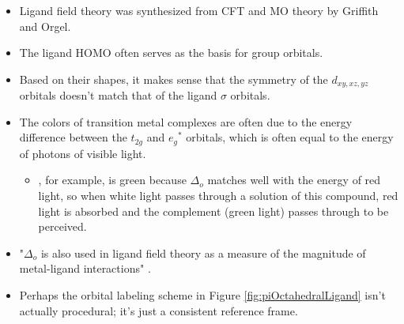 \documentclass[../notes.tex]{subfiles}
\begin{document}
\begin{itemize}
\begin{itemize}
\begin{figure}[h!]
            \caption{Crystal field splitting from the free ion.}
            \label{fig:CFT-freeIon}
        \end{figure}
        \item "The average energy of the five $d$ orbitals [in a coordination complex] is above that of the free ion orbitals [i.e., those in the metal ion before it is surrounded by ligands], because the electrostatic field of the ligands raises their energy" \parencite[364]{bib:MiesslerFischerTarr}.
        \item CFT is flawed because as we can see from Figure \ref{fig:CFT-freeIon}, there is no energetically favorable bonding; at best, we could have zero energy difference between the free ion and bonded octahedral field state (this occurs if only the $t_{2g}$ orbitals are occupied).
    \end{itemize}
    \item {}Ligand field theory was synthesized from CFT and MO theory by Griffith and Orgel.
    \item The ligand HOMO often serves as the basis for group orbitals.
    \item Based on their shapes, it makes sense that the symmetry of the $d_{xy,xz,yz}$ orbitals doesn't match that of the ligand $\sigma$ orbitals.
    \item The colors of transition metal complexes are often due to the energy difference between the $t_{2g}$ and ${e_g}^*$ orbitals, which is often equal to the energy of photons of visible light.
    \begin{itemize}
        \item {}, for example, is green because $\Delta_o$ matches well with the energy of red light, so when white light passes through a solution of this compound, red light is absorbed and the complement (green light) passes through to be perceived.
    \end{itemize}
    \item "$\Delta_o$ is also used in ligand field theory as a measure of the magnitude of metal-ligand interactions" \parencite[367]{bib:MiesslerFischerTarr}.
    \item Perhaps the orbital labeling scheme in Figure \ref{fig:piOctahedralLigand} isn't actually procedural; it's just a consistent reference frame.

\end{itemize}
\end{document}

